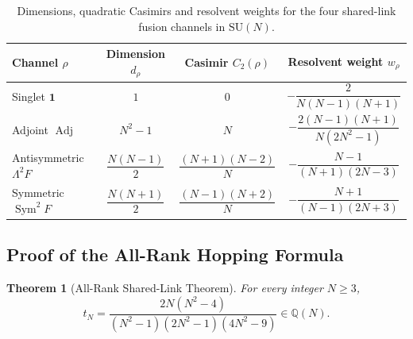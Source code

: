 \documentclass[11pt,a4paper]{article}
\newtheorem{theorem}{Theorem}[section]
\theoremstyle{definition}
\DeclareMathOperator{\Adj}{Adj}
\DeclareMathOperator{\Sym}{Sym}
\newcommand{\Q}{\mathbb{Q}}
\newcommand{\SU}{\mathrm{SU}}
\begin{document}
\begin{table}[htbp]
\centering
\caption{Dimensions, quadratic Casimirs and resolvent weights for the four shared-link fusion channels in $\SU(N)$.}\label{tab:channels}
\vspace{0.5em}
\begin{tabular}{@{}lccc@{}}
\toprule
Channel $\rho$ & Dimension $d_\rho$ & Casimir $C_2(\rho)$ & Resolvent weight $w_\rho$ \\
\midrule
Singlet $\mathbf{1}$ & $1$ & $0$ & $-\dfrac{2}{N(N-1)(N+1)}$ \\[1em]
Adjoint $\Adj$ & $N^2-1$ & $N$ & $-\dfrac{2(N-1)(N+1)}{N(2N^2-1)}$ \\[1em]
Antisymmetric $\Lambda^2 F$ & $\dfrac{N(N-1)}{2}$ & $\dfrac{(N+1)(N-2)}{N}$ & $-\dfrac{N-1}{(N+1)(2N-3)}$ \\[1em]
Symmetric $\Sym^2 F$ & $\dfrac{N(N+1)}{2}$ & $\dfrac{(N-1)(N+2)}{N}$ & $-\dfrac{N+1}{(N-1)(2N+3)}$ \\
\bottomrule
\end{tabular}
\end{table}

\subsection{Proof of the All-Rank Hopping Formula}

\begin{theorem}[All-Rank Shared-Link Theorem]\label{thm:tN_derivation}
For every integer $N \ge 3$,
\begin{equation}\label{eq:tN_closed}
  t_N = \frac{2N(N^2-4)}{(N^2-1)(2N^2-1)(4N^2-9)} \in \Q(N).
\end{equation}
\end{theorem}
\end{document}

